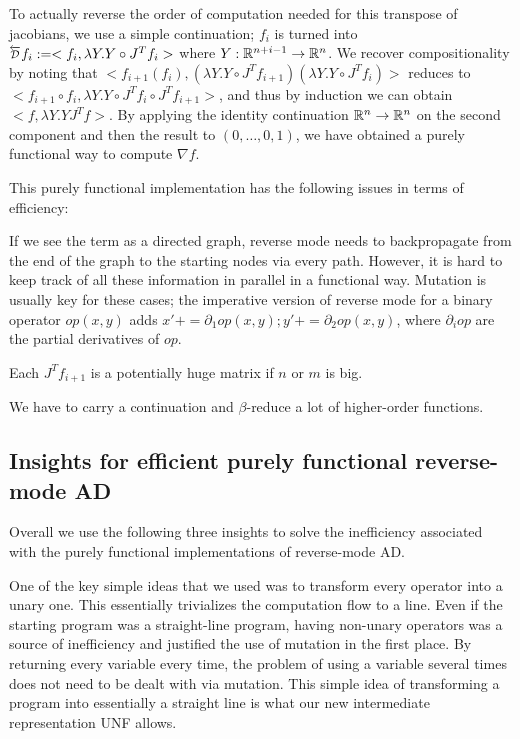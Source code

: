 To actually reverse the order of computation needed for this transpose of jacobians, we use a simple continuation;
$f_i$ is turned into $\Dsynrevsymbol{f_i}:=<f_i, \lambda Y. Y\circ J^Tf_i>$ where $Y:\mathbb{R}^{n+i-1}\to \mathbb{R}^n$. 
We recover compositionality by noting that $<f_{i+1}(f_i), (\lambda Y. Y\circ J^Tf_{i+1})(\lambda Y. Y\circ J^Tf_i)>$ reduces to
$<f_{i+1}\circ f_i, \lambda Y. Y\circ J^Tf_i \circ J^Tf_{i+1}>$, and thus by induction we can obtain $<f, \lambda Y. YJ^Tf>$.
By applying the identity continuation $\mathbb{R}^n\to\mathbb{R}^n$ on the second component and then the result to $(0,\ldots,0,1)$, 
we have obtained a purely functional way to compute $\nabla f$. 

This purely functional implementation has the following issues in terms of efficiency: 

If we see the term as a directed graph, reverse mode needs to backpropagate from the end of the graph to the starting nodes via every path.
However, it is hard to keep track of all these information in parallel in a functional way.
Mutation is usually key for these cases; 
the imperative version of reverse mode for a binary operator $op(x,y)$ adds $x'+= \partial_1op(x,y);y'+= \partial_2op(x,y)$, 
where $\partial_iop$ are the partial derivatives of $op$.

Each $J^Tf_{i+1}$ is a potentially huge matrix if $n$ or $m$ is big.

We have to carry a continuation and $\beta$-reduce a lot of higher-order functions.

\subsection{Insights for efficient purely functional reverse-mode AD}
\label{subsec:insights}
Overall we use the following three insights to solve the inefficiency associated with the purely functional implementations of reverse-mode AD.

One of the key simple ideas that we used was to transform every operator into a unary one. 
This essentially trivializes the computation flow to a line. 
Even if the starting program was a straight-line program, 
having non-unary operators was a source of inefficiency and justified the use of mutation in the first place.
By returning every variable every time, the problem of using a variable several times does not need to be dealt with via mutation. 
This simple idea of transforming a program into essentially a straight line is what our new intermediate representation UNF allows.

